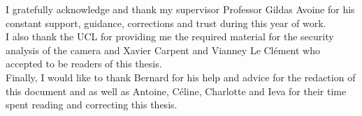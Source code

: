 \vspace{5cm}

I gratefully acknowledge and thank my supervisor Professor Gildas Avoine for his constant support, guidance, corrections and trust during this year of work.\\

I also thank the UCL for providing me the required material for the security analysis of the camera and Xavier Carpent and Vianney Le Clément who accepted to be readers of this thesis.\\

Finally, I would like to thank Bernard for his help and advice for the redaction of this document and as well as Antoine, Céline, Charlotte and Ieva for their time spent reading and correcting this thesis.

